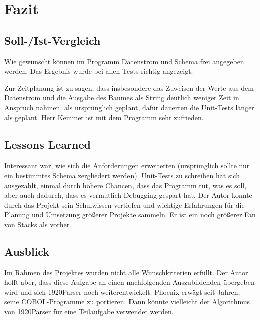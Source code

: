\section{Fazit} 
\label{sec:Fazit}

\subsection{Soll-/Ist-Vergleich}
\label{sec:SollIstVergleich}
Wie gewünscht können im Programm Datenstrom und Schema frei angegeben werden. Das Ergebnis wurde bei allen Tests richtig angezeigt.

Zur Zeitplanung ist zu sagen, dass insbesondere das Zuweisen der Werte aus dem Datenstrom und die Ausgabe des Baumes als String deutlich weniger Zeit in Anspruch nahmen, als ursprünglich geplant, dafür dauerten die Unit-Tests länger als geplant.
Herr Kemmer ist mit dem Programm sehr zufrieden.
\subsection{Lessons Learned}
\label{sec:LessonsLearned}
Interessant war, wie sich die Anforderungen erweiterten (ursprünglich sollte nur ein bestimmtes Schema zergliedert werden). Unit-Tests zu schreiben hat sich ausgezahlt, einmal durch höhere Chancen, dass das Programm tut, was es soll, aber auch dadurch, dass es vermutlich Debugging gespart hat. Der Autor konnte durch das Projekt sein Schulwissen vertiefen und wichtige Erfahrungen für die Planung und Umsetzung größerer Projekte sammeln. Er ist ein noch größerer Fan von Stacks als vorher.
\subsection{Ausblick}
\label{sec:Ausblick}
Im Rahmen des Projektes wurden nicht alle Wunschkriterien erfüllt. Der Autor hofft aber, dass diese Aufgabe an einen nachfolgenden Auszubildenden übergeben wird und sich 1920Parser noch weiterentwickelt. Phoenix erwägt seit Jahren, seine COBOL-Programme zu portieren. Dann könnte vielleicht der Algorithmus von 1920Parser für eine Teilaufgabe verwendet werden.





